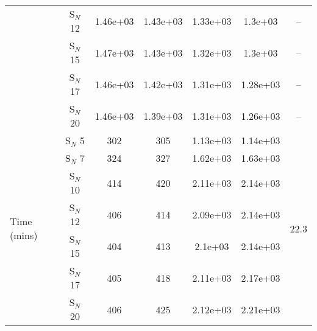 \begin{tabular}{lc|ccccc}
      {}     & S$_N$ 12 &   1.46e+03 &  1.43e+03 &   1.33e+03 &      1.3e+03 &      -- \\
      {}     & S$_N$ 15 &   1.47e+03 &  1.43e+03 &   1.32e+03 &      1.3e+03 &      -- \\
      {}     & S$_N$ 17 &   1.46e+03 &  1.42e+03 &   1.31e+03 &     1.28e+03 &      -- \\
      {}     & S$_N$ 20 &   1.46e+03 &  1.39e+03 &   1.31e+03 &     1.26e+03 &      -- \\
\midrule
\multirow{7}{*}{Time (mins)}  &  S$_N$ 5 &        302 &       305 &   1.13e+03 &
1.14e+03 &    \multirow{7}{*}{22.3} \\
      {}     &  S$_N$ 7 &        324 &       327 &   1.62e+03 &     1.63e+03 &    {}   \\
      {}     & S$_N$ 10 &        414 &       420 &   2.11e+03 &     2.14e+03 &    {}   \\
      {}     & S$_N$ 12 &        406 &       414 &   2.09e+03 &     2.14e+03 &    {}   \\
      {}     & S$_N$ 15 &        404 &       413 &    2.1e+03 &     2.14e+03 &    {}   \\
      {}     & S$_N$ 17 &        405 &       418 &   2.11e+03 &     2.17e+03 &    {}   \\
      {}     & S$_N$ 20 &        406 &       425 &   2.12e+03 &     2.21e+03 &    {}   \\
\bottomrule
\end{tabular}
